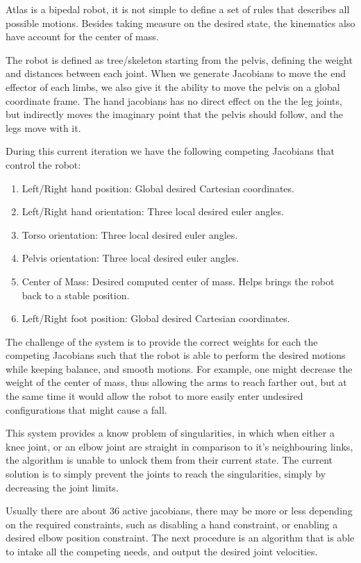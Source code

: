 \documentclass{article}
\begin{document}
Atlas is a bipedal robot, it is not simple to define a set of rules that describes all possible motions. Besides taking measure on the desired state, the kinematics also have account for the center of mass.

The robot is defined as tree/skeleton starting from the pelvis, defining the weight and distances between each joint. When we generate Jacobians to move the end effector of each limbs, we also give it the ability to move the pelvis on a global coordinate frame. The hand jacobians has no direct effect on the the leg joints, but indirectly moves the imaginary point that the pelvis should follow, and the legs move with it. 

During this current iteration we have the following competing Jacobians that control the robot: 
\begin{enumerate}
\item Left/Right hand position: Global desired Cartesian coordinates.
\item Left/Right hand orientation: Three local desired euler angles.
\item Torso orientation: Three local desired euler angles.
\item Pelvis orientation: Three local desired euler angles.
\item Center of Mass: Desired computed center of mass. Helps brings the robot back to a stable position.
\item Left/Right foot position: Global desired Cartesian coordinates.
\end{enumerate}

The challenge of the system is to provide the correct weights for each the competing Jacobians such that the robot is able to perform the desired motions while keeping balance, and smooth motions. For example, one might decrease the weight of the center of mass, thus allowing the arms to reach farther out, but at the same time it would allow the robot to more easily enter undesired configurations that might cause a fall.

This system provides a know problem of singularities, in which when either a knee joint, or an elbow joint are straight in comparison to it's neighbouring links, the algorithm is unable to unlock them from their current state. The current solution is to simply prevent the joints to reach the singularities, simply by decreasing the joint limits. 

Usually there are about 36 active jacobians, there may be more or less depending on the required constraints, such as disabling a hand constraint, or enabling a desired elbow position constraint. The next procedure is an algorithm that is able to intake all the competing needs, and output the desired joint velocities. 
\end{document}
